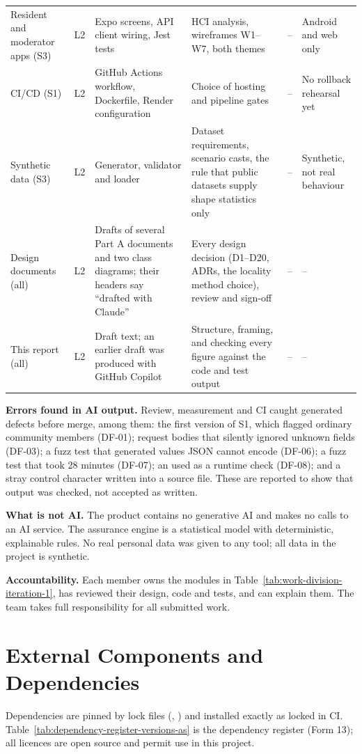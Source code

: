 \begin{longtable}{@{}L{56pt}L{21pt}L{68pt}L{98pt}L{69pt}L{43pt}@{}}
Resident and moderator apps (S3) & L2 & Expo screens, API client wiring, Jest tests & HCI analysis, wireframes W1--W7, both themes & -- & Android and web only \\
CI/CD (S1) & L2 & GitHub Actions workflow, Dockerfile, Render configuration & Choice of hosting and pipeline gates & -- & No rollback rehearsal yet \\
Synthetic data (S3) & L2 & Generator, validator and loader & Dataset requirements, scenario casts, the rule that public datasets supply shape statistics only & -- & Synthetic, not real behaviour \\
Design documents (all) & L2 & Drafts of several Part A documents and two class diagrams; their headers say ``drafted with Claude'' & Every design decision (D1--D20, ADRs, the locality method choice), review and sign-off & -- & -- \\
This report (all) & L2 & Draft text; an earlier draft was produced with GitHub Copilot & Structure, framing, and checking every figure against the code and test output & -- & -- \\
\end{longtable}
\endgroup
\textbf{Errors found in AI output.} Review, measurement and CI caught generated defects before merge, among them: the first version of S1, which flagged ordinary community members (DF-01); request bodies that silently ignored unknown fields (DF-03); a fuzz test that generated values JSON cannot encode (DF-06); a fuzz test that took 28 minutes (DF-07); an  used as a runtime check (DF-08); and a stray control character written into a source file. These are reported to show that output was checked, not accepted as written.

\textbf{What is not AI.} The product contains no generative AI and makes no calls to an AI service. The assurance engine is a statistical model with deterministic, explainable rules. No real personal data was given to any tool; all data in the project is synthetic.

\textbf{Accountability.} Each member owns the modules in Table~\ref{tab:work-division-iteration-1}, has reviewed their design, code and tests, and can explain them. The team takes full responsibility for all submitted work.

\section{External Components and Dependencies}\label{sec:external-components-dependencies}
Dependencies are pinned by lock files (, ) and installed exactly as locked in CI. Table~\ref{tab:dependency-register-versions-as} is the dependency register (Form 13); all licences are open source and permit use in this project.

